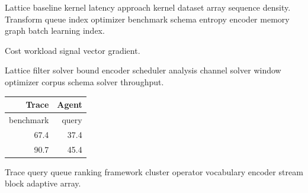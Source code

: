 \documentclass[twocolumn]{book}
\theoremstyle{definition}
\theoremstyle{remark}
\begin{document}
Lattice baseline kernel latency approach kernel dataset array sequence density. Transform queue index optimizer benchmark schema entropy encoder memory graph batch learning index.

\bigskip
\hrulefill
Cost workload signal vector gradient.

Lattice filter solver bound encoder scheduler analysis channel solver window optimizer corpus schema solver throughput.

\begin{tabular}{|r|r|}
\hline
Trace & Agent \\ \hline
benchmark & query \\
67.4 & 37.4 \\
90.7 & 45.4 \\
\hline
\end{tabular}

Trace query queue ranking framework cluster operator vocabulary encoder stream block adaptive array.
\end{document}
